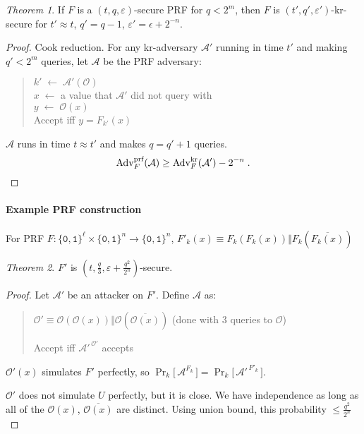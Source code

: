 \documentclass[11pt]{article}
\newcommand{\eqdef}{\ensuremath{\equiv}}
\newcommand{\eps}{\ensuremath{\varepsilon}}
\newcommand{\bit}{\ensuremath{\{\texttt{0},\texttt{1}\}}}
\theoremstyle{remark}
\newtheorem{thm}{Theorem}
\begin{document}
\begin{thm}
If $F$ is a $(t,q,\eps)$-secure PRF
for $q < 2^m$, then
$F$ is $(t',q',\eps')$-kr-secure for
$t' \approx t$, $q' = q-1$, $\eps' = \epsilon + 2^{-n}$.
\begin{proof}
Cook reduction.
For any kr-adversary $\mathcal{A'}$ running in
time $t'$ and making $q'<2^m$ queries, let $\mathcal{A}$ be
the PRF adversary:
\begin{quote}
$k' \; \leftarrow \; \mathcal{A}'(\mathcal{O})$ \\
$x \; \leftarrow$ a value that $\mathcal{A}'$ did not query with \\
$y \; \leftarrow \; \mathcal{O}(x)$ \\
Accept iff $y = F_{k'}(x)$
\end{quote}
$\mathcal{A}$ runs in time $t \approx t'$ and makes $q = q'+1$ queries.
\[ \textrm{Adv}_F^\textrm{prf}(\mathcal{A}) \ge
\textrm{Adv}_F^\textrm{kr}(\mathcal{A}') - 2^{-n}
\;\textrm{.} \qedhere \]
\end{proof}
\end{thm}

\paragraph{Example PRF construction}
For PRF $F : \bit^\ell \times \bit^n \rightarrow \bit^n$,
$F'_k(x) \eqdef F_k(F_k(x)) \Vert F_k(\overline{F_k(x)})$

\begin{thm}
$F'$ is $\displaystyle (t, \frac{q}{3}, \eps + \frac{q^2}{2^n})$-secure.
\begin{proof}
Let $\mathcal{A}'$ be an attacker on $F'$.
Define $\mathcal{A}$ as:
\begin{quote}
$\mathcal{O}' \eqdef
\mathcal{O}(\mathcal{O}(x)) \Vert \mathcal{O}(\overline{\mathcal{O}(x)})$
(done with $3$ queries to $\mathcal{O}$)

Accept iff $\mathcal{A}'^{\,\mathcal{O}'}$ accepts
\end{quote}
$\mathcal{O}'(x)$ simulates $F'$ perfectly, so
$\displaystyle
\Pr_k \big[\, \mathcal{A}^{F_k} \,\big] =
\Pr_k \big[\, \mathcal{A'}^{\,F'_k} \,\big]$.

$\mathcal{O}'$ does not simulate $U$ perfectly, but it is close.
We have independence as long as all of the
$\mathcal{O}(x)$, $\overline{\mathcal{O}(x)}$ are distinct.
Using union bound, this probability $\le \frac{q^2}{2^n}$
\end{proof}
\end{thm}
\end{document}
